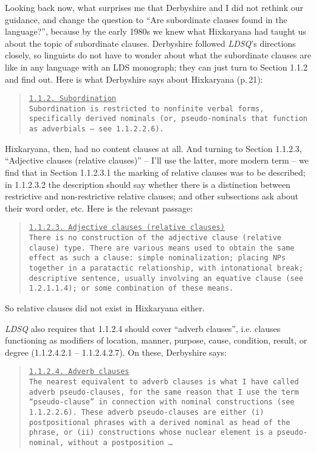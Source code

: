 \documentclass[output=paper,colorlinks,citecolor=brown
]{langscibook}
\begin{document}
Looking back now, what surprises me that Derbyshire and I did not rethink
our guidance, and change the question to ``Are subordinate clauses found
in the language?'', because by the early 1980s we knew what Hixkaryana had
taught us about the topic of subordinate clauses. Derbyshire followed
\textit{LDSQ}'s directions closely, so linguists do not have to wonder
about what the subordinate clauses are like in any language with an
LDS monograph; they can just turn to Section 1.1.2 and find out. Here
is what Derbyshire says about Hixkaryana (p.\,21):

\begin{quote}
\small
\underline{\underline{\texttt{1.1.2. Subordination}}}\\[0.5ex]
\texttt{Subordination is restricted to nonfinite verbal forms,
specifically derived nominals (or, pseudo-nominals that function
as adverbials – see 1.1.2.2.6).}
\end{quote}

\noindent
Hixkaryana, then, had no content clauses at all. And turning to
Section 1.1.2.3, ``Adjective clauses (relative clauses)'' -- I'll
use the latter, more modern term -- we find that in Section
1.1.2.3.1 the marking of relative clauses was to be described;
in 1.1.2.3.2 the description should say whether there is a
distinction between restrictive and non-restrictive relative clauses;
and other subsections ask about their word order, etc. Here is
the relevant passage:

\begin{quote}
\small
\underline{\underline{\texttt{1.1.2.3. Adjective clauses
(relative clauses)}}}\\[0.5ex]
\texttt{There is no construction of the adjective clause (relative
clause) type. There are various means used to obtain the same effect
as such a clause: simple nominalization; placing NPs together in a
paratactic relationship, with intonational break; descriptive
sentence, usually involving an equative clause (see 1.2.1.1.4);
or some combination of these means.}
\end{quote}

\noindent
So relative clauses did not exist in Hixkaryana either.

\textit{LDSQ} also requires that 1.1.2.4 should cover ``adverb clauses'',
i.e.  clauses functioning as modifiers of location, manner, purpose,
cause, condition, result, or degree (1.1.2.4.2.1 -- 1.1.2.4.2.7).
On these, Derbyshire says:

\begin{quote}
\small
\underline{\underline{\texttt{1.1.2.4. Adverb clauses}}}\\[0.5ex]
\texttt{The nearest equivalent to adverb clauses is what I have
called adverb pseudo-clauses, for the same reason that I use
the term “pseudo-clause” in connection with nominal constructions
(see 1.1.2.2.6). These adverb pseudo-clauses are either (i)
postpositional phrases with a derived nominal as head of
the phrase, or (ii) constructions whose nuclear element is a
pseudo-nominal, without a postposition \ldots }
\end{quote}
\end{document}
